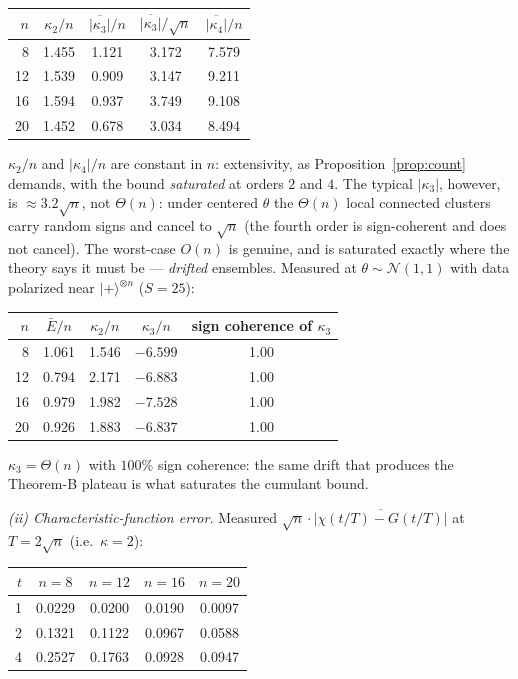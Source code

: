 \documentclass[11pt]{article}
\theoremstyle{remark}
\newcommand{\Ebar}{\bar{E}}
\begin{document}
\begin{center}
\begin{tabular}{rcccc}
\toprule
$n$ & $\kappa_2/n$ & $\overline{|\kappa_3|}/n$ &
$\overline{|\kappa_3|}/\sqrt n$ & $\overline{|\kappa_4|}/n$\\
\midrule
 8 & 1.455 & 1.121 & 3.172 & 7.579\\
12 & 1.539 & 0.909 & 3.147 & 9.211\\
16 & 1.594 & 0.937 & 3.749 & 9.108\\
20 & 1.452 & 0.678 & 3.034 & 8.494\\
\bottomrule
\end{tabular}
\end{center}

$\kappa_2/n$ and $|\kappa_4|/n$ are constant in $n$: extensivity, as
Proposition~\ref{prop:count} demands, with the bound \emph{saturated} at
orders $2$ and $4$. The typical $|\kappa_3|$, however, is
$\approx 3.2\sqrt n$, not $\Theta(n)$: under centered $\theta$ the
$\Theta(n)$ local connected clusters carry random signs and cancel to
$\sqrt n$ (the fourth order is sign-coherent and does not cancel). The
worst-case $O(n)$ is genuine, and is saturated exactly where the theory
says it must be --- \emph{drifted} ensembles. Measured at
$\theta\sim\mathcal N(1,1)$ with data polarized near
$|+\rangle^{\otimes n}$ ($S=25$):

\begin{center}
\begin{tabular}{rcccc}
\toprule
$n$ & $\Ebar/n$ & $\kappa_2/n$ & $\kappa_3/n$ & sign coherence of
$\kappa_3$\\
\midrule
 8 & 1.061 & 1.546 & $-6.599$ & 1.00\\
12 & 0.794 & 2.171 & $-6.883$ & 1.00\\
16 & 0.979 & 1.982 & $-7.528$ & 1.00\\
20 & 0.926 & 1.883 & $-6.837$ & 1.00\\
\bottomrule
\end{tabular}
\end{center}

$\kappa_3=\Theta(n)$ with $100\%$ sign coherence: the same drift that
produces the Theorem-B plateau is what saturates the cumulant bound.

\medskip
\noindent\emph{(ii) Characteristic-function error.} Measured
$\sqrt n\cdot\overline{|\chi(t/T)-G(t/T)|}$ at $T=2\sqrt n$ (i.e.\
$\kappa=2$):

\begin{center}
\begin{tabular}{rcccc}
\toprule
$t$ & $n=8$ & $n=12$ & $n=16$ & $n=20$\\
\midrule
1 & 0.0229 & 0.0200 & 0.0190 & 0.0097\\
2 & 0.1321 & 0.1122 & 0.0967 & 0.0588\\
4 & 0.2527 & 0.1763 & 0.0928 & 0.0947\\
\bottomrule
\end{tabular}
\end{center}
\end{document}
